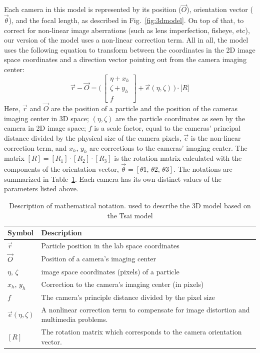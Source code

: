 \documentclass[10pt,a4paper]{article}
\begin{document}
Each camera in this model is represented by its position ($\vec O$), orientation vector ($\vec \theta$), and the focal length, as described in Fig.~\ref{fig:3dmodel}. On top of that, to correct for non-linear image aberrations (such as lens imperfection, fisheye, etc), our version of the model uses a non-linear correction term. All in all, the model uses the following equation to transform between the coordinates in the 2D image space coordinates and a direction vector pointing out from the camera imaging center:
%
\begin{equation}
\vec{r}-\vec{O} = \Big( \, 
\begin{bmatrix}
\eta + x_h\\
\zeta + y_h \\
f
\end{bmatrix}
+ \vec{e}(\eta, \zeta) \,\Big) \cdot \Big[ R \Big]
\label{eq:3dmodel}
\end{equation}
%
Here, $\vec{r}$ and $\vec{O}$ are the position of a particle and the position of the cameras imaging center in 3D space; $(\eta, \zeta)$ are the particle coordinates as seen by the camera in 2D image space; $f$ is a scale factor, equal to the cameras' principal distance divided by the physical size of the camera pixels, $\vec e$ is the non-linear correction term, and $x_h,\, y_h$ are corrections to the cameras' imaging center. The matrix $[R]= [R_1]\cdot [R_2] \cdot [R_3]$ is the rotation matrix calculated with the components of the orientation vector, $\vec{\theta} = [\theta 1,\, \theta 2,\, \theta 3]$. 
The notations are summarized in Table~\ref{tab1:mathdesc}. Each camera has its own distinct values of the parameters listed above. 



\begin{table}[!hb]
	\centering
	\caption{Description of mathematical notation. used to describe the 3D model based on the Tsai model \label{tab1:mathdesc}}
	\begin{tabular}{p{5em} p{30em}}
		\hline
		Symbol & Description \\ \hline
		$\vec{r}$ & Particle position in the lab space coordinates\\
		$\vec{O} $& Position of a camera's imaging center \\
		$\eta, \, \zeta$ & image space coordinates (pixels) of a particle \\
		$x_h , \, y_h$ & Correction to the camera's imaging center (in pixels)\\
		$f$ & The camera's principle distance divided by the pixel size \\ 
		$\vec{e}(\eta, \zeta)$ & A nonlinear correction term to compensate for image distortion and multimedia problems.\\
		$[R]$ & The rotation matrix which corresponds to the camera orientation vector. \\  \hline
	\end{tabular}
\end{table}
\end{document}
